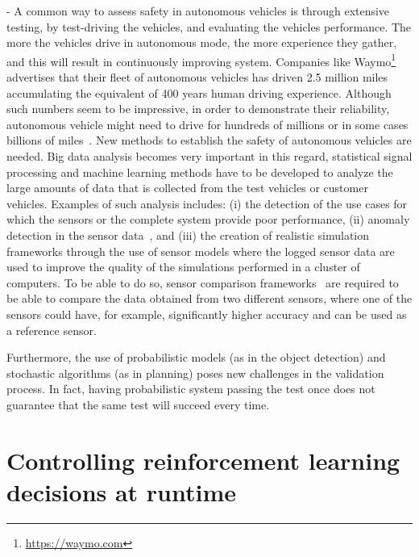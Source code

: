 \documentclass[sigconf,review, anonymous]{acmart}
\begin{document}
 - A common way to assess safety in autonomous vehicles is through extensive testing, by test-driving the vehicles, and evaluating the vehicles performance. The more the vehicles drive in autonomous mode, the more experience they gather, and this will result in %
continuously improving system.
Companies like Waymo\footnote{\url{https://waymo.com}} advertises that their fleet of autonomous vehicles has driven 2.5 million miles accumulating the equivalent of 400 years human driving experience. Although such numbers seem to be impressive, in order to demonstrate their reliability, autonomous vehicle might need to drive for hundreds of millions or in some cases billions of miles~\cite{Kalra:2016em}. New methods to establish the safety of autonomous vehicles are needed. Big data analysis becomes very important in this regard, statistical signal processing and machine learning methods have to be developed to analyze the large amounts of data that is collected from the test vehicles or customer vehicles. Examples of such analysis includes: (i) the detection of the use cases for which the sensors or the complete system provide poor performance, (ii) anomaly detection in the sensor data~\cite{Tashvir2017}, and (iii) the creation of realistic simulation frameworks through the use of sensor models where the logged sensor data are used to improve the quality of the %
simulations performed in a cluster of computers. To be able to do so, sensor comparison frameworks~\cite{Florbaeck2016} are required to be able to compare the data obtained from two different sensors, where one of the sensors could have,  for example, significantly higher accuracy and can be used as a reference sensor.

Furthermore, the use of probabilistic models (as in the object detection) and stochastic algorithms (as in planning) poses new challenges in the validation process.  In fact, having %
probabilistic system passing the test once does not guarantee that the same test will succeed every time. %

\section{Controlling reinforcement learning decisions at runtime}\label{sec:approach}
\end{document}

